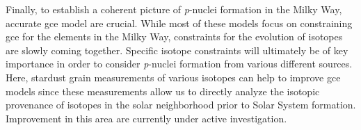 Finally, to establish a coherent picture of \textit{p}-nuclei formation in the Milky Way, accurate \ac{gce} model are crucial. While most of these models focus on constraining \ac{gce} for the elements in the Milky Way, constraints for the evolution of isotopes are slowly coming together. Specific isotope constraints will ultimately be of key importance in order to consider \textit{p}-nuclei formation from various different sources. Here, stardust grain measurements of various isotopes can help to improve \ac{gce} models since these measurements allow us to directly analyze the isotopic provenance of isotopes in the solar neighborhood prior to Solar System formation. Improvement in this area are currently under active investigation.
